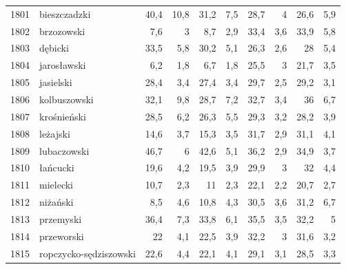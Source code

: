 \begin{center}
\begin{longtable}{lp{3cm}rrrrrrrr}
1801 & bieszczadzki            & 40,4    & 10,8        & 31,2     & 7,5          & 28,7     & 4            & 26,6     & 5,9          \\
1802 & brzozowski              & 7,6     & 3           & 8,7      & 2,9          & 33,4     & 3,6          & 33,9     & 5,8          \\
1803 & dębicki                 & 33,5    & 5,8         & 30,2     & 5,1          & 26,3     & 2,6          & 28       & 5,4          \\
1804 & jarosławski             & 6,2     & 1,8         & 6,7      & 1,8          & 25,5     & 3            & 21,7     & 3,5          \\
1805 & jasielski               & 28,4    & 3,4         & 27,4     & 3,4          & 29,7     & 2,5          & 29,2     & 3,1          \\
1806 & kolbuszowski            & 32,1    & 9,8         & 28,7     & 7,2          & 32,7     & 3,4          & 36       & 6,7          \\
1807 & krośnieński             & 28,5    & 6,2         & 26,3     & 5,5          & 29,3     & 3,2          & 28,2     & 3,9          \\
1808 & leżajski                & 14,6    & 3,7         & 15,3     & 3,5          & 31,7     & 2,9          & 31,1     & 4,1          \\
1809 & lubaczowski             & 46,7    & 6           & 42,6     & 5,1          & 36,2     & 2,9          & 34,9     & 3,7          \\
1810 & łańcucki                & 19,6    & 4,2         & 19,5     & 3,9          & 29,9     & 3            & 32       & 4,4          \\
1811 & mielecki                & 10,7    & 2,3         & 11       & 2,3          & 22,1     & 2,2          & 20,7     & 2,7          \\
1812 & niżański                & 8,5     & 4,6         & 10,8     & 4,3          & 30,5     & 3,6          & 31,2     & 6,7          \\
1813 & przemyski               & 36,4    & 7,3         & 33,8     & 6,1          & 35,5     & 3,5          & 32,2     & 5            \\
1814 & przeworski              & 22      & 4,1         & 22,5     & 3,9          & 32,2     & 3            & 31,6     & 3,2          \\
1815 & ropczycko-sędziszowski  & 22,6    & 4,4         & 22,1     & 4,1          & 29,1     & 3,1          & 28,5     & 3,3          \\

\end{longtable}
\end{center}
